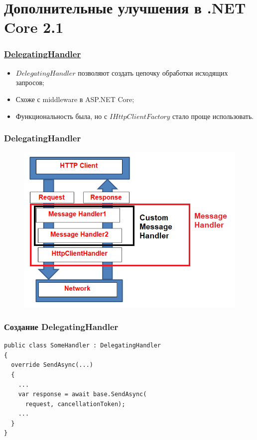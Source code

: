 \documentclass[17pt,aspectratio=169]{beamer}
\begin{document}
\section{Дополнительные улучшения в .NET Core 2.1}
\begin{frame}
\frametitle{\href{https://docs.microsoft.com/en-us/dotnet/api/system.net.http.delegatinghandler?view=netcore-2.2}{DelegatingHandler}}
\begin{itemize}
	\item <1-> $DelegatingHandler$ позволяют создать цепочку обработки исходящих запросов;
	\item <2-> Схоже с middleware в ASP.NET Core;
	\item <3-> Функциональность была, но с $IHttpClientFactory$ стало проще использовать.
\end{itemize}
\end{frame}

\begin{frame}[fragile]
\frametitle{DelegatingHandler}
\begin{figure}
\includegraphics[scale=0.65]{handlers}
\end{figure}
\end{frame}

\begin{frame}[fragile]
\frametitle{Создание DelegatingHandler}
\begin{lstlisting}
public class SomeHandler : DelegatingHandler
{
  override SendAsync(...)
  {
    ...
    var response = await base.SendAsync(
      request, cancellationToken);
    ...
  }
}     
\end{lstlisting}
\end{frame}
\end{document}
